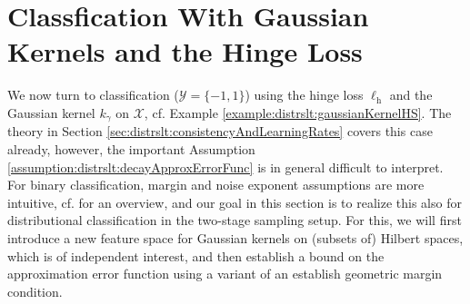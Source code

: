 \documentclass[letterpaper]{article} %
\newcommand{\inputSet}{\mathcal{X}} %
\newcommand{\outputSet}{\mathcal{Y}} %
\newcommand{\ellHinge}{\ell_{\mathrm{h}}} %
\begin{document}
\section{Classfication With Gaussian Kernels and the Hinge Loss} \label{sec:distrslt:classificationWithGaussianKernelAndHingeLoss}
We now turn to classification ($\outputSet=\{-1,1\}$) using the hinge loss $\ellHinge$ and the Gaussian kernel $k_\gamma$ on $\inputSet$, cf. Example \ref{example:distrslt:gaussianKernelHS}.
The theory in Section \ref{sec:distrslt:consistencyAndLearningRates} covers this case already, however, the important Assumption \ref{assumption:distrslt:decayApproxErrorFunc} is in general difficult to interpret.
For binary classification, margin and noise exponent assumptions are more intuitive, cf. \cite[Chapter~8]{SC08} for an overview,
and our goal in this section is to realize this also for distributional classification in the two-stage sampling setup.
For this, we will first introduce a new feature space for Gaussian kernels on (subsets of) Hilbert spaces, which is of independent interest,
and then establish a bound on the approximation error function using a variant of an establish geometric margin condition.
\end{document}
